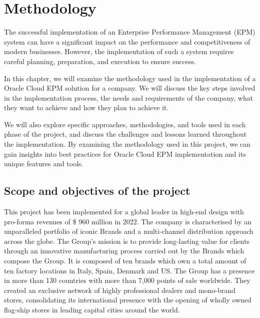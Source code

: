 \documentclass[12pt,a4paper,openright,twoside]{book}
\begin{document}
\chapter{Methodology}
\label{chap:design}

The successful implementation of an Enterprise Performance Management (EPM) system can have a significant impact on the performance and competitiveness of modern businesses. 
%
However, the implementation of such a system requires careful planning, preparation, and execution to ensure success. 

In this chapter, we will examine the methodology used in the implementation of a Oracle Cloud EPM solution for a company.
%
We will discuss the key steps involved in the implementation process, the needs and requirements of the company, what they want to achieve and how they plan to achieve it.

We will also explore specific approaches, methodologies, and tools used in each phase of the project, and discuss the challenges and lessons learned throughout the implementation. 
%
By examining the methodology used in this project, we can gain insights into best practices for Oracle Cloud EPM implementation and its unique features and tools.

\section{Scope and objectives of the project}

This project has been implemented for a global leader in high-end design with pro-forma revenues of \$ 960 million in 2022.
%
The company is characterised by an unparalleled portfolio of iconic Brands and a multi-channel distribution approach across the globe.
%
The Group’s mission is to provide long-lasting value for clients through an innovative manufacturing process carried out by the Brands which compose the Group.
%
It is composed of ten brands which own a total amount of ten factory locations in Italy, Spain, Denmark and US.
%
The Group has a presence in more than 130 countries with more than 7,000 points of sale worldwide. 
%
They created an exclusive network of highly professional dealers and mono-brand stores, consolidating its international presence with the opening of wholly owned flag-ship stores in leading capital cities around the world.
\end{document}
